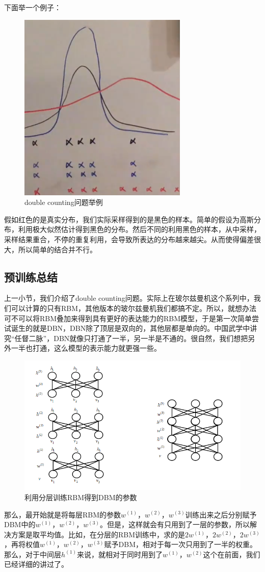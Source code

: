 \documentclass[a4paper]{article}
\begin{document}
下面举一个例子：
\begin{figure}[H]
    \centering
    \includegraphics[width=.3\textwidth]{微信图片_20200523152628.png}
    \caption{double counting问题举例}
    \label{fig:my_label_1}
\end{figure}

假如红色的是真实分布，我们实际采样得到的是黑色的样本。简单的假设为高斯分布，利用极大似然估计得到黑色的分布。然后不同的利用黑色的样本，从中采样，采样结果重合，不停的重复利用，会导致所表达的分布越来越尖。从而使得偏差很大，所以简单的结合并不行。

\subsection{预训练总结}
上一小节，我们介绍了double counting问题。实际上在玻尔兹曼机这个系列中，我们可以计算的只有RBM，其他版本的玻尔兹曼机我们都搞不定。所以，就想办法可不可以将RBM叠加来得到具有更好的表达能力的RBM模型，于是第一次简单尝试诞生的就是DBN，DBN除了顶层是双向的，其他层都是单向的。中国武学中讲究“任督二脉”，DBN就像只打通了一半，另一半是不通的。很自然，我们想把另外一半也打通，这么模型的表示能力就更强一些。
\begin{figure}[H]
    \centering
    \includegraphics[width=.8\textwidth]{微信图片_20200523155948.png}
    \caption{利用分层训练RBM得到DBM的参数}
    \label{fig:my_label_1}
\end{figure}
那么，最开始就是将每层RBM的参数$w^{(1)}$，$w^{(2)}$，$w^{(3)}$训练出来之后分别赋予DBM中的$w^{(1)}$，$w^{(2)}$，$w^{(3)}$。但是，这样就会有只用到了一层的参数，所以解决方案是取平均值。比如，在分层的RBM训练中，求的是$2w^{(1)}$，$2w^{(2)}$，$2w^{(3)}$，再将权值$w^{(1)}$，$w^{(2)}$，$w^{(3)}$赋予DBM，相对于每一次只用到了一半的权重。那么，对于中间层$h^{(1)}$来说，就相对于同时用到了$w^{(1)}$，$w^{(2)}$这个在前面，我们已经详细的讲过了。
\end{document}
